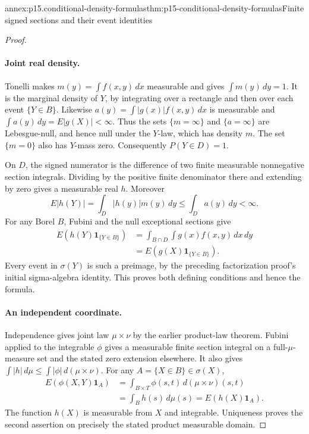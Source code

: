 \begin{annexitem}{annex:p15.conditional-density-formulas}{thm:p15-conditional-density-formulas}{Finite signed sections and their event identities}
\begin{proof}
\paragraph{Joint real density.}
Tonelli makes \(m(y)=\int f(x,y)\,dx\) measurable and gives
\(\int m(y)\,dy=1\). It is the marginal density of \(Y\), by
integrating over a rectangle and then over each event \(\{Y\in B\}\).
Likewise \(a(y)=\int|g(x)|f(x,y)\,dx\) is measurable and
\(\int a(y)\,dy=E|g(X)|<\infty\).
Thus the sets \(\{m=\infty\}\) and \(\{a=\infty\}\) are Lebesgue-null,
and hence null under the \(Y\)-law, which has density \(m\).
The set \(\{m=0\}\) also has \(Y\)-mass zero.
Consequently \(P(Y\in D)=1\).

On \(D\), the signed numerator is the difference of two finite
measurable nonnegative section integrals. Dividing by the positive
finite denominator there and extending by zero gives a measurable
real \(h\). Moreover
\[
                    E|h(Y)|=\int_D|h(y)|m(y)\,dy
                                   \leq\int_Da(y)\,dy<\infty.
\]
For any Borel \(B\), Fubini and the null exceptional sections give
\[
 \begin{aligned}
 E(h(Y)\mathbf1_{\{Y\in B\}})
   &=\int_{B\cap D}\int g(x)f(x,y)\,dx\,dy\\
   &=E(g(X)\mathbf1_{\{Y\in B\}}).
 \end{aligned}
\]
Every event in \(\sigma(Y)\) is such a preimage, by the preceding
factorization proof's initial sigma-algebra identity.
This proves both defining conditions and hence the formula.

\paragraph{An independent coordinate.}
Independence gives joint law \(\mu\times\nu\) by the earlier
product-law theorem. Fubini applied to the integrable \(\phi\)
gives a measurable finite section integral on a full-\(\mu\)-measure
set and the stated zero extension elsewhere.
It also gives \(\int|h|\,d\mu\leq\int|\phi|\,d(\mu\times\nu)\).
For any \(A=\{X\in B\}\in\sigma(X)\),
\[
 \begin{aligned}
 E(\phi(X,Y)\mathbf1_A)
   &=\int_{B\times T}\phi(s,t)\,d(\mu\times\nu)(s,t)\\
   &=\int_Bh(s)\,d\mu(s)=E(h(X)\mathbf1_A).
 \end{aligned}
\]
The function \(h(X)\) is measurable from \(X\) and integrable.
Uniqueness proves the second assertion on precisely the stated
product measurable domain.
\end{proof}
\end{annexitem}

